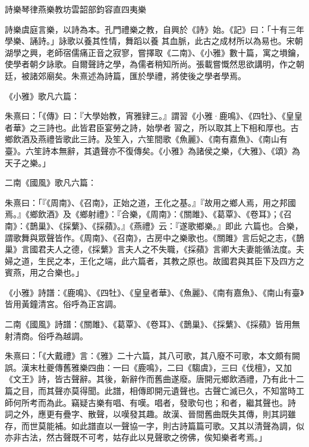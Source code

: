 
\begin{pinyinscope}

 詩樂琴律燕樂教坊雲韶部鈞容直四夷樂



 詩樂虞庭言樂，以詩為本。孔門禮樂之教，自興於《詩》始。《記》曰：「十有三年學樂、誦詩。」詠歌以養其性情，舞蹈以養
 其血脈，此古之成材所以為易也。宋朝湖學之興，老師宿儒痛正音之寂寥，嘗擇取《二南》、《小雅》數十篇，寓之塤鑰，使學者朝夕詠歌。自爾聲詩之學，為儒者稍知所尚。張載嘗慨然思欲講明，作之朝廷，被諸郊廟矣。朱熹述為詩篇，匯於學禮，將使後之學者學焉。



 《小雅》歌凡六篇：



 朱熹曰：「《傳》曰：『大學始教，宵雅肄三。』謂習《小雅·鹿鳴》、《四牡》、《皇皇者華》之三詩也。此皆君臣宴勞之詩，始學者
 習之，所以取其上下相和厚也。古鄉飲酒及燕禮皆歌此三詩。及笙入，六笙間歌《魚麗》、《南有嘉魚》、《南山有臺》。六笙詩本無辭，其遺聲亦不復傳矣。《小雅》為諸侯之樂，《大雅》、《頌》為天子之樂。」



 二南《國風》歌凡六篇：



 朱熹曰：「『《周南》、《召南》，正始之道，王化之基。』『故用之鄉人焉，用之邦國焉。』《鄉飲酒》及《鄉射禮》：『合樂，《周南》：《關雎》、《葛覃》、《卷耳》；《召南》：《鵲巢》、《採蘩》、《採蘋》。』《燕禮》云：『遂歌鄉樂。』即此
 六篇也。合樂，謂歌舞與眾聲皆作。《周南》、《召南》，古房中之樂歌也。《關雎》言后妃之志，《鵲巢》言國君夫人之德，《採蘩》言夫人之不失職，《採蘋》言卿大夫妻能循法度。夫婦之道，生民之本，王化之端，此六篇者，其教之原也。故國君與其臣下及四方之賓燕，用之合樂也。」



 《小雅》詩譜：《鹿鳴》、《四牡》、《皇皇者華》、《魚麗》、《南有嘉魚》、《南山有臺》皆用黃鐘清宮。俗呼為正宮調。



 二南《國風》詩譜：《關雎》、《葛覃》、《卷耳》、《鵲巢》、《採蘩》、《採蘋》皆用無
 射清商。俗呼為越調。



 朱熹曰：「《大戴禮》言：《雅》二十六篇，其八可歌，其八廢不可歌，本文頗有闕誤。漢末杜夔傳舊雅樂四曲：一曰《鹿鳴》，二曰《騶虞》，三曰《伐檀》，又加《文王》詩，皆古聲辭。其後，新辭作而舊曲遂廢。唐開元鄉飲酒禮，乃有此十二篇之目，而其聲亦莫得聞。此譜，相傳即開元遺聲也。古聲亡滅已久，不知當時工師何所考而為此。竊疑古樂有唱、有嘆。唱者，發歌句也；和者，繼其聲也。詩
 詞之外，應更有疊字、散聲，以嘆發其趣。故漢、晉間舊曲既失其傳，則其詞雖存，而世莫能補。如此譜直以一聲協一字，則古詩篇篇可歌。又其以清聲為調，似亦非古法，然古聲既不可考，姑存此以見聲歌之徬佛，俟知樂者考焉。」




\end{pinyinscope}
